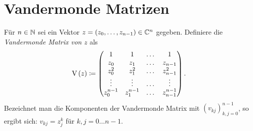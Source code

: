 \section{Vandermonde Matrizen}
\begin{mydef}
    Für $n \in \mathbb{N}$ sei ein Vektor $z = (z_0, \dots, z_{n-1}) \in \mathbb{C}^n$ gegeben.
    Definiere die \emph{Vandermonde Matrix von $z$} als
    \[
        \text{V}\left( z \right) \coloneqq \begin{pmatrix}
            1         & 1         & \dots & 1 \\
            z_0       & z_1       & \dots & z_{n-1} \\
            z_0^2     & z_1^2     & \dots & z_{n-1}^2 \\
            \vdots    & \vdots    & \dots & \vdots \\
            z_0^{n-1} & z_1^{n-1} & \dots & z_{n-1}^{n-1}
        \end{pmatrix}.
    \]
    Bezeichnet man die Komponenten der Vandermonde Matrix mit
    $\left( v_{kj} \right)_{k,j = 0}^{n-1}$, so ergibt sich:
    $ v_{kj} = z_j^k $ für $k, j = 0 \dots n-1$.
\end{mydef}
